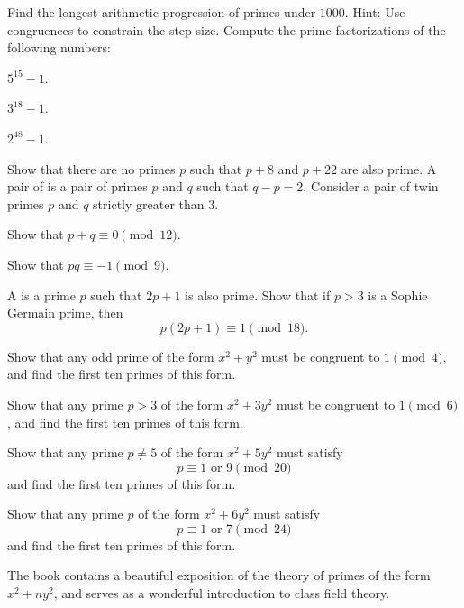 \begin{routine}
  \exercise Find the longest arithmetic progression of primes under $1000$. Hint: Use congruences to constrain the step size.
  \exercise Compute the prime factorizations of the following numbers:
  \begin{subexenum}
  \item $5^{15}-1$.
  \item $3^{18}-1$.
  \item $2^{48}-1$.
  \end{subexenum}
  \exercise Show that there are no primes $p$ such that $p+8$ and $p+22$ are also prime.
  \exercise \label{exercise:modular-restrictions-twin-primes}A pair of  is a pair of primes $p$ and $q$ such that $q-p=2$. Consider a pair of twin primes $p$ and $q$ strictly greater than $3$.
  \begin{subexenum}
  \item Show that $p+q\equiv 0\pmod{12}$.
  \item Show that $pq\equiv -1\pmod{9}$.
  \end{subexenum}
  \exercise \label{exercise:sophie-germain-primes}A  is a prime $p$ such that $2p+1$ is also prime. Show that if $p>3$ is a Sophie Germain prime, then
  \begin{equation*}
    p(2p+1)\equiv 1\pmod{18}.
  \end{equation*}
  \exercise 
  \begin{subexenum}
  \item Show that any odd prime of the form $x^2+y^2$ must be congruent to $1\pmod{4}$, and find the first ten primes of this form.
  \item Show that any prime $p>3$ of the form $x^2+3y^2$ must be congruent to $1\pmod{6}$, and find the first ten primes of this form.
  \item Show that any prime $p\neq 5$ of the form $x^2+5y^2$ must satisfy
    \begin{equation*}
      p\equiv 1\text{ or }9\pmod{20}
    \end{equation*}
    and find the first ten primes of this form.
  \item Show that any prime $p$ of the form $x^2+6y^2$ must satisfy
    \begin{equation*}
      p\equiv 1\text{ or }7\pmod{24}
    \end{equation*}
    and find the first ten primes of this form.
  \end{subexenum}
  The book \cite{cox1989} contains a beautiful exposition of the theory of primes of the form $x^2+ny^2$, and serves as a wonderful introduction to class field theory.

\end{routine}
